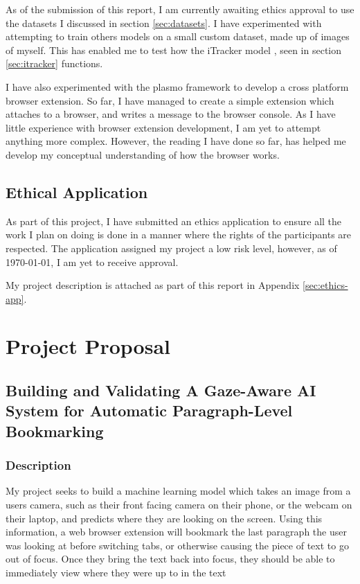 \documentclass[twocolumn]{report}
\begin{document}
As of the submission of this report, I am currently awaiting ethics approval to use the datasets I discussed in section \ref{sec:datasets}. I have experimented with attempting to train others models on a small custom dataset, made up of images of myself. This has enabled me to test how the iTracker model \cite{krafka2016eye}, seen in section \ref{sec:itracker} functions. 

I have also experimented with the plasmo framework to develop a cross platform browser extension. So far, I have managed to create a simple extension which attaches to a browser, and writes a message to the browser console. As I have little experience with browser extension development, I am yet to attempt anything more complex. However, the reading I have done so far, \cite{frisbe2022building} has helped me develop my conceptual understanding of how the browser works. 

\section{Ethical Application}

As part of this project, I have submitted an ethics application to ensure all the work I plan on doing is done in a manner where the rights of the participants are respected. The application assigned my project a low risk level, however, as of \today, I am yet to receive approval. 

My project description is attached as part of this report in Appendix \ref{sec:ethics-app}. 

\appendix

\chapter{Project Proposal}

\section*{Building and Validating A Gaze-Aware AI System for Automatic Paragraph-Level Bookmarking}

\subsection*{Description}
My project seeks to build a machine learning model which takes an image from a users camera, such as their front facing camera on their phone, or the webcam on their laptop, and predicts where they are looking on the screen. Using this information, a web browser extension will bookmark the last paragraph the user was looking at before switching tabs, or otherwise causing the piece of text to go out of focus. Once they bring the text back into focus, they should be able to immediately view where they were up to in the text
\end{document}
